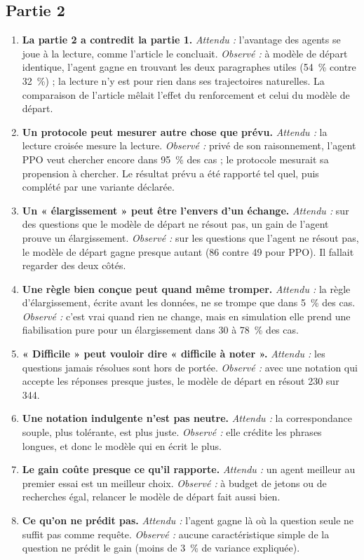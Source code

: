 \documentclass[10pt,a4paper]{article}
\begin{document}
\subsection*{Partie 2}
\begin{enumerate}[resume]
\item \textbf{La partie 2 a contredit la partie 1.} \emph{Attendu :} l'avantage des agents se joue à la lecture, comme l'article le concluait. \emph{Observé :} à modèle de départ identique, l'agent gagne en trouvant les deux paragraphes utiles (54~\% contre 32~\%) ; la lecture n'y est pour rien dans ses trajectoires naturelles. La comparaison de l'article mêlait l'effet du renforcement et celui du modèle de départ.
\item \textbf{Un protocole peut mesurer autre chose que prévu.} \emph{Attendu :} la lecture croisée mesure la lecture. \emph{Observé :} privé de son raisonnement, l'agent PPO veut chercher encore dans 95~\% des cas ; le protocole mesurait sa propension à chercher. Le résultat prévu a été rapporté tel quel, puis complété par une variante déclarée.
\item \textbf{Un « élargissement » peut être l'envers d'un échange.} \emph{Attendu :} sur des questions que le modèle de départ ne résout pas, un gain de l'agent prouve un élargissement. \emph{Observé :} sur les questions que l'agent ne résout pas, le modèle de départ gagne presque autant (86 contre 49 pour PPO). Il fallait regarder des deux côtés.
\item \textbf{Une règle bien conçue peut quand même tromper.} \emph{Attendu :} la règle d'élargissement, écrite avant les données, ne se trompe que dans 5~\% des cas. \emph{Observé :} c'est vrai quand rien ne change, mais en simulation elle prend une fiabilisation pure pour un élargissement dans 30 à 78~\% des cas.
\item \textbf{« Difficile » peut vouloir dire « difficile à noter ».} \emph{Attendu :} les questions jamais résolues sont hors de portée. \emph{Observé :} avec une notation qui accepte les réponses presque justes, le modèle de départ en résout 230 sur 344.
\item \textbf{Une notation indulgente n'est pas neutre.} \emph{Attendu :} la correspondance souple, plus tolérante, est plus juste. \emph{Observé :} elle crédite les phrases longues, et donc le modèle qui en écrit le plus.
\item \textbf{Le gain coûte presque ce qu'il rapporte.} \emph{Attendu :} un agent meilleur au premier essai est un meilleur choix. \emph{Observé :} à budget de jetons ou de recherches égal, relancer le modèle de départ fait aussi bien.
\item \textbf{Ce qu'on ne prédit pas.} \emph{Attendu :} l'agent gagne là où la question seule ne suffit pas comme requête. \emph{Observé :} aucune caractéristique simple de la question ne prédit le gain (moins de 3~\% de variance expliquée).
\end{enumerate}
\end{document}
